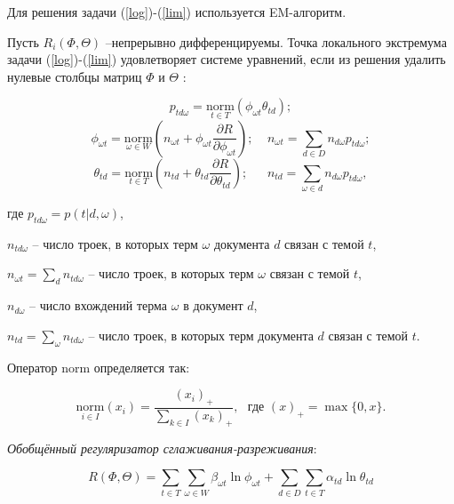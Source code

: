 \documentclass[a4paper, 12pt]{article}
\begin{document}
    Для решения задачи (\ref{log})-(\ref{lim}) используется EM-алгоритм.
    
    Пусть $R_i(\Phi, \Theta)$ --непрерывно дифференцируемы. Точка локального экстремума задачи (\ref{log})-(\ref{lim}) удовлетворяет системе уравнений, если из решения удалить нулевые столбцы матриц $\Phi$ и $\Theta$ \citep{vorontsov2020}:

    \begin{equation}\label{EM1}
        p_{td\omega} = \underset{t \in T}{\text{norm}}(\phi_{\omega t}\theta_{td});
    \end{equation}
    \begin{equation}\label{EM2}
        \phi_{\omega t} = \underset{\omega \in W}{\text{norm}}\left(n_{\omega t} + \phi_{\omega t} \frac{\partial R}{\partial \phi_{\omega t}}\right); ~~~~~ n_{\omega t} = \sum\limits_{d \in D}n_{d \omega}p_{td\omega};
    \end{equation}
    \begin{equation}\label{EM3}
        \theta_{td} = \underset{t \in T}{\text{norm}}\left(n_{td} + \theta_{td} \frac{\partial R}{\partial \theta_{td}}\right); ~~~~~~~ n_{td} = \sum\limits_{\omega \in d}n_{d \omega}p_{td\omega},
    \end{equation}

    где $p_{td\omega} = p(t | d, \omega)$, 
    
    $n_{td\omega}$ -- число троек, в которых терм $\omega$ документа $d$ связан с темой $t$, 
    
    $n_{\omega t} = \sum_dn_{td\omega}$ -- число троек, в которых терм $\omega$ связан с темой $t$,

    $n_{d \omega}$ -- число вхождений терма $\omega$ в документ $d$,

    $n_{td} = \sum_{\omega}n_{td\omega}$ -- число троек, в которых терм документа $d$ связан с темой $t$.
    
    Оператор norm определяется так:

    \[\underset{i \in I}{\text{norm}}(x_i) = \frac{(x_i)_{+}}{\sum\limits_{k \in I}(x_k)_{+}}, ~~~ \text{где } (x)_{+} = \max\{0, x\}.\]

    \textit{Обобщённый регуляризатор сглаживания-разреживания}:

    \begin{equation}
        R(\Phi, \Theta) = \sum\limits_{t \in T}\sum\limits_{\omega \in W}\beta_{\omega t}\ln\phi_{\omega t} + \sum\limits_{d \in D}\sum\limits_{t \in T}\alpha_{td}\ln\theta_{td}
    \end{equation}
\end{document}
